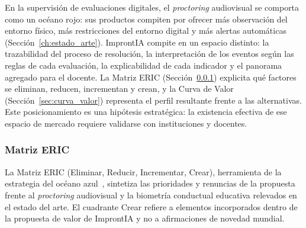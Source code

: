 En la supervisión de evaluaciones digitales, el \textit{proctoring} audiovisual se comporta como un océano rojo: sus productos compiten por ofrecer más observación del entorno físico, más restricciones del entorno digital y más alertas automáticas (Sección~\ref{ch:estado_arte}). ImprontIA compite en un espacio distinto: la trazabilidad del proceso de resolución, la interpretación de los eventos según las reglas de cada evaluación, la explicabilidad de cada indicador y el panorama agregado para el docente. La Matriz ERIC (Sección~\ref{sec:eric}) explicita qué factores se eliminan, reducen, incrementan y crean, y la Curva de Valor (Sección~\ref{sec:curva_valor}) representa el perfil resultante frente a las alternativas. Este posicionamiento es una hipótesis estratégica: la existencia efectiva de ese espacio de mercado requiere validarse con instituciones y docentes.

\subsubsection{Matriz ERIC}
\label{sec:eric}

La Matriz ERIC (Eliminar, Reducir, Incrementar, Crear), herramienta de la estrategia del océano azul~\parencite{KimMauborgne2005}, sintetiza las prioridades y renuncias de la propuesta frente al \textit{proctoring} audiovisual y la biometría conductual educativa relevados en el estado del arte. El cuadrante Crear refiere a elementos incorporados dentro de la propuesta de valor de ImprontIA y no a afirmaciones de novedad mundial.

